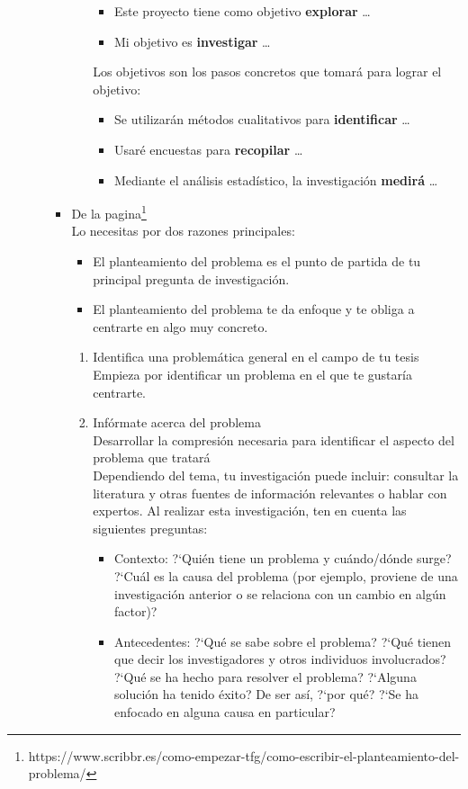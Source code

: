 \documentclass[a4paper,14pt]{article}
\begin{document}
\begin{itemize}
\begin{enumerate}
\begin{itemize}
\begin{itemize}
\begin{itemize}
\item Este proyecto tiene como objetivo \textbf{explorar} …
\item Mi objetivo es \textbf{investigar} …
    \end{itemize}
Los objetivos son los pasos concretos que tomará para lograr el objetivo:
\begin{itemize}
\item    Se utilizarán métodos cualitativos para \textbf{identificar} …
\item Usaré encuestas para \textbf{recopilar} …
\item Mediante el análisis estadístico, la investigación \textbf{medirá} … 
\end{itemize}  
\end{itemize}

\item De la pagina\footnote{https://www.scribbr.es/como-empezar-tfg/como-escribir-el-planteamiento-del-problema/}\\
Lo necesitas por dos razones principales:
\begin{itemize} \item El planteamiento del problema es el punto de partida de tu principal pregunta de investigación. \item El planteamiento del problema te da enfoque y te obliga a centrarte en algo muy concreto.
\end{itemize}
\begin{enumerate}
\item  Identifica una problemática general en el campo de tu tesis\\
Empieza por identificar un problema en el que te gustaría centrarte.
\item Infórmate acerca del problema\\
Desarrollar la compresión necesaria para identificar el aspecto del problema que tratará\\
Dependiendo del tema, tu investigación puede incluir: consultar la literatura y otras fuentes de información relevantes o hablar con expertos. Al realizar esta investigación, ten en cuenta las siguientes preguntas:
\begin{itemize}
\item  Contexto: ?`Quién tiene un problema y cuándo/dónde surge? ?`Cuál es la causa del problema (por ejemplo, proviene de una investigación anterior o se relaciona con un cambio en algún factor)?
\item  Antecedentes: ?`Qué se sabe sobre el problema? ?`Qué tienen que decir los investigadores y otros individuos involucrados? ?`Qué se ha hecho para resolver el problema? ?`Alguna solución ha tenido éxito? De ser así, ?`por qué? ?`Se ha enfocado en alguna causa en particular?

\end{itemize}
\end{enumerate}
\end{itemize}
\end{enumerate}
\end{itemize}
\end{document}
